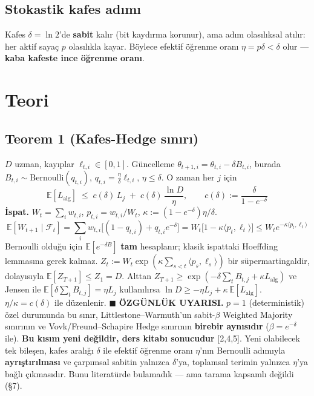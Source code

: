 \documentclass[11pt]{article}
\newenvironment{notkutu}{\def\FrameCommand{\fboxsep=6pt\colorbox{kutu}}\MakeFramed{\advance\hsize-\width\FrameRestore}\small}{\endMakeFramed}
\begin{document}
\subsection*{Stokastik kafes adımı}
Kafes $\delta=\ln2$'de \textbf{sabit} kalır (bit kaydırma korunur), ama adım olasılıksal atılır: her aktif sayaç $p$ olasılıkla kayar. Böylece efektif öğrenme oranı $\eta = p\delta < \delta$ olur — \textbf{kaba kafeste ince öğrenme oranı}.
\section*{Teori}
\subsection*{Teorem 1 (Kafes-Hedge sınırı)}
$D$ uzman, kayıplar $\ell_{t,i}\in[0,1]$. Güncelleme $\theta_{t+1,i} = \theta_{t,i} - \delta B_{t,i}$, burada $B_{t,i}\sim\mathrm{Bernoulli}(q_{t,i})$, $q_{t,i} = \tfrac{\eta}{\delta}\ell_{t,i}$, $\eta\le\delta$. O zaman her $j$ için
\[\mathbb{E}[L_{\mathrm{alg}}] \;\le\; c(\delta)\,L_j \;+\; c(\delta)\,\frac{\ln D}{\eta}, \qquad c(\delta) := \frac{\delta}{1-e^{-\delta}}\]
\textbf{İspat.} $W_t=\sum_i w_{t,i}$, $p_{t,i}=w_{t,i}/W_t$, $\kappa := (1-e^{-\delta})\eta/\delta$.
\[\mathbb{E}[W_{t+1}\mid\mathcal F_t] = \sum_i w_{t,i}\big[(1-q_{t,i}) + q_{t,i}e^{-\delta}\big] = W_t\big[1-\kappa\langle p_t,\ell_t\rangle\big] \le W_t e^{-\kappa\langle p_t,\ell_t\rangle}\]
Bernoulli olduğu için $\mathbb{E}[e^{-\delta B}]$ \textbf{tam} hesaplanır; klasik ispattaki Hoeffding lemmasına gerek kalmaz. $Z_t := W_t\exp(\kappa\sum_{s<t}\langle p_s,\ell_s\rangle)$ bir süpermartingaldir, dolayısıyla $\mathbb{E}[Z_{T+1}]\le Z_1 = D$. Alttan $Z_{T+1}\ge \exp(-\delta\sum_t B_{t,j} + \kappa L_{\mathrm{alg}})$ ve Jensen ile $\mathbb{E}[\delta\sum_t B_{t,j}] = \eta L_j$ kullanılırsa $\ln D \ge -\eta L_j + \kappa\,\mathbb{E}[L_{\mathrm{alg}}]$. $\eta/\kappa = c(\delta)$ ile düzenlenir. $\blacksquare$
\begin{notkutu} \textbf{ÖZGÜNLÜK UYARISI.} $p=1$ (deterministik) özel durumunda bu sınır, Littlestone–Warmuth'un sabit-$\beta$ Weighted Majority sınırının ve Vovk/Freund–Schapire Hedge sınırının \textbf{birebir aynısıdır} ($\beta = e^{-\delta}$ ile). \textbf{Bu kısım yeni değildir, ders kitabı sonucudur} [2,4,5]. Yeni olabilecek tek bileşen, kafes aralığı $\delta$ ile efektif öğrenme oranı $\eta$'nın Bernoulli adımıyla \textbf{ayrıştırılması} ve çarpımsal sabitin yalnızca $\delta$'ya, toplamsal terimin yalnızca $\eta$'ya bağlı çıkmasıdır. Bunu literatürde bulamadık — ama tarama kapsamlı değildi (§7).
\end{notkutu}
\end{document}
